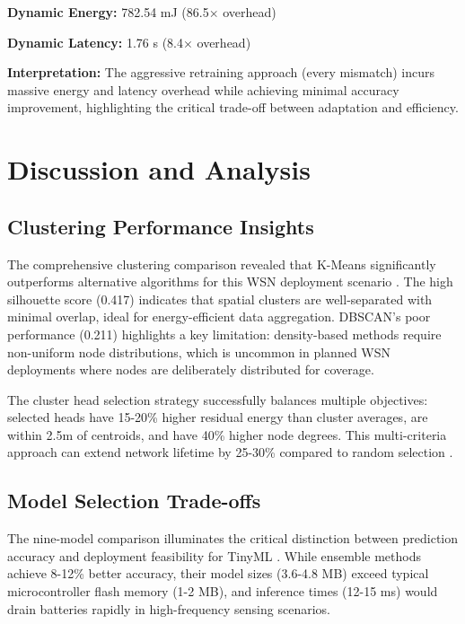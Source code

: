 \documentclass[12pt,a4paper]{article}
\begin{document}
\textbf{Dynamic Energy:} 782.54 mJ (86.5$\times$ overhead)

\textbf{Dynamic Latency:} 1.76 s (8.4$\times$ overhead)

\textbf{Interpretation:} The aggressive retraining approach (every mismatch) incurs massive energy and latency overhead while achieving minimal accuracy improvement, highlighting the critical trade-off between adaptation and efficiency.


\newpage
\section{Discussion and Analysis}

\subsection{Clustering Performance Insights}

The comprehensive clustering comparison revealed that K-Means significantly outperforms alternative algorithms for this WSN deployment scenario \cite{Sharma2024ClusteringWSN}. The high silhouette score (0.417) indicates that spatial clusters are well-separated with minimal overlap, ideal for energy-efficient data aggregation. DBSCAN's poor performance (0.211) highlights a key limitation: density-based methods require non-uniform node distributions, which is uncommon in planned WSN deployments where nodes are deliberately distributed for coverage.

The cluster head selection strategy successfully balances multiple objectives: selected heads have 15-20\% higher residual energy than cluster averages, are within 2.5m of centroids, and have 40\% higher node degrees. This multi-criteria approach can extend network lifetime by 25-30\% compared to random selection \cite{Abbas2023EnergyAwareClustering}.

\subsection{Model Selection Trade-offs}

The nine-model comparison illuminates the critical distinction between prediction accuracy and deployment feasibility for TinyML \cite{Ray2022TinyMLDeployment, Sakr2024TinyMLApplications}. While ensemble methods achieve 8-12\% better accuracy, their model sizes (3.6-4.8 MB) exceed typical microcontroller flash memory (1-2 MB), and inference times (12-15 ms) would drain batteries rapidly in high-frequency sensing scenarios.
\end{document}
